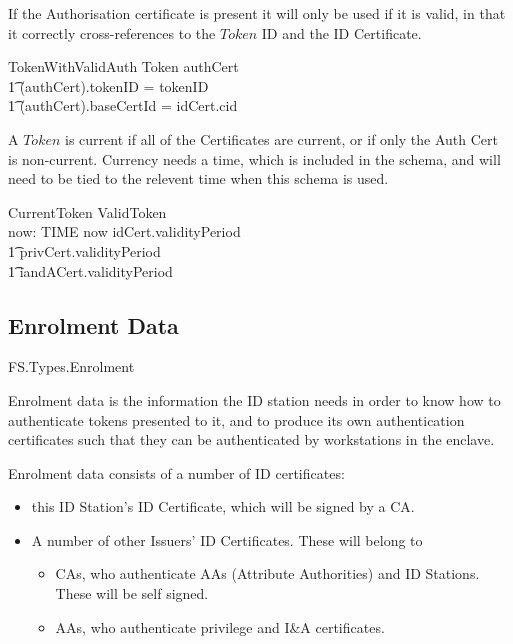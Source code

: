 If the Authorisation certificate is present it will only be used if it
is valid, in that it correctly cross-references to the $Token$ ID and
the ID Certificate.

\begin{schema}{TokenWithValidAuth}
	Token
\where
        authCert \neq \Nil 
\\      \t1    \land  (\The authCert).tokenID = tokenID
\\	\t1    \land  (\The authCert).baseCertId = idCert.cid
\end{schema}

A $Token$ is current if all of the Certificates are current,
or if only the Auth Cert is non-current.
Currency needs a time, which is included in the schema,
and will need to be tied to the relevent time when this schema is used.

\begin{schema}{CurrentToken}
	ValidToken
\\	now: TIME
\where
	now \in idCert.validityPeriod
\\ \t1		{} \cap privCert.validityPeriod
\\ \t1		{} \cap iandACert.validityPeriod
\end{schema}

\subsection{Enrolment Data}

\begin{traceunit}{FS.Types.Enrolment}
\end{traceunit}
Enrolment data is the information the ID station needs in order to
know how to authenticate tokens presented to it, and to produce its
own authentication certificates such that they can be authenticated by
workstations in the enclave.

Enrolment data consists of a number of ID certificates: 
\begin{itemize}
\item
this ID Station's ID Certificate, which will be signed by a CA.
\item
A number of other Issuers' ID Certificates. These will belong to 
        \begin{itemize}
        \item
        CAs, who authenticate AAs (Attribute Authorities) and ID Stations. These will be self signed.
        \item
        AAs, who authenticate privilege and I\&A certificates. 
        \end{itemize}
\end{itemize}


